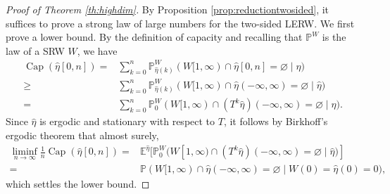\documentclass{article}
\DeclareMathOperator{\Ca}{Cap}
\renewcommand{\P}{\mathbb{P}}
\newcommand{\E}{\mathbb{E}}
\newcommand{\1}{\mathbf{1}}
\newcommand{\heta}{\hat\eta}
\theoremstyle{definition}
\numberwithin{equation}{section}
\numberwithin{theorem}{section}
\begin{document}
\begin{proof}[Proof of Theorem \ref{th:highdim}]
By Proposition \ref{prop:reductiontwosided}, it suffices to prove a strong law of large numbers for the two-sided LERW. We first prove a lower bound. By the definition of capacity and recalling that $\P^W$ is the law of a SRW $W$, we have 
\begin{equation}
	\begin{split}
		\Ca(\heta[0,n])=&\sum_{k=0}^n\P_{\heta(k)}^W(W[1,\infty)\cap\heta[0,n]=\varnothing\mid\heta)\\
		\geq&\sum_{k=0}^n\P_{\heta(k)}^W(W[1,\infty)\cap\heta(-\infty,\infty)=\varnothing\mid\heta)\\
		=&\sum_{k=0}^n\P_{0}^W(W[1,\infty)\cap(T^k\heta)(-\infty,\infty)=\varnothing\mid\heta).
	\end{split}
\end{equation}
Since $\heta$ is ergodic and stationary with respect to $T$, it follows by Birkhoff's ergodic theorem \cite[Theorem 24.1]{billingsley1995probability} that almost surely,
\begin{equation}
	\begin{split}
	\liminf_{n\rightarrow\infty}\frac{1}{n}\Ca(\heta[0,n])=&\E^{\heta}[\P_{0}^W(W[1,\infty)\cap(T^k\heta)(-\infty,\infty)=\varnothing\mid\heta)]\\
		=&\P(W[1,\infty)\cap\heta(-\infty,\infty)=\varnothing\mid W(0)=\heta(0)=0),
	\end{split}
\end{equation}
which settles the lower bound.


\end{proof}
\end{document}
